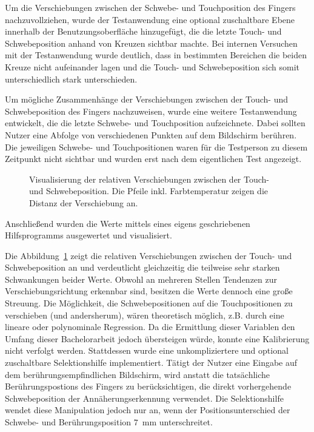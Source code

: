 \documentclass[12pt,numbers=noenddot,parskip,bibliography=totocnumbered,listof=totocnumbered]{scrreprt}
\begin{document}
Um die Verschiebungen zwischen der Schwebe- und Touchposition des Fingers nachzuvollziehen, wurde der Testanwendung eine optional zuschaltbare Ebene innerhalb der Benutzungsoberfläche hinzugefügt, die die letzte Touch- und Schwebeposition anhand von Kreuzen sichtbar machte. Bei internen Versuchen mit der Testanwendung wurde deutlich, dass in bestimmten Bereichen die beiden Kreuze nicht aufeinander lagen und die Touch- und Schwebeposition sich somit unterschiedlich stark unterschieden.

Um mögliche Zusammenhänge der Verschiebungen zwischen der Touch- und Schwebeposition des Fingers nachzuweisen, wurde eine weitere Testanwendung entwickelt, die die letzte Schwebe- und Touchposition aufzeichnete. Dabei sollten Nutzer eine Abfolge von verschiedenen Punkten auf dem Bildschirm berühren. Die jeweiligen Schwebe- und Touchpositionen waren für die Testperson zu diesem Zeitpunkt nicht sichtbar und wurden erst nach dem eigentlichen Test angezeigt.
\begin{figure}
\centering
{}
\hfill
{}
\caption{Visualisierung der relativen Verschiebungen zwischen der Touch- und Schwebeposition. Die Pfeile inkl. Farbtemperatur zeigen die Distanz der Verschiebung an.}
\label{klickschwebepositionen}
\end{figure}
Anschließend wurden die Werte mittels eines eigens geschriebenen Hilfsprogramms ausgewertet und visualisiert.

Die Abbildung~\ref{klickschwebepositionen} zeigt die relativen Verschiebungen zwischen der Touch- und Schwebeposition an und verdeutlicht gleichzeitig die teilweise sehr starken Schwankungen beider Werte. Obwohl an mehreren Stellen Tendenzen zur Verschiebungsrichtung erkennbar sind, besitzen die Werte dennoch eine große Streuung. Die Möglichkeit, die Schwebepositionen auf die Touchpositionen zu verschieben (und andersherum), wären theoretisch möglich, z.B. durch eine lineare oder polynominale Regression. Da die Ermittlung dieser Variablen den Umfang dieser Bachelorarbeit jedoch übersteigen würde, konnte eine Kalibrierung nicht verfolgt werden. Stattdessen wurde eine unkompliziertere und optional zuschaltbare Selektionshilfe implementiert. Tätigt der Nutzer eine Eingabe auf dem berührungsempfindlichen Bildschirm, wird anstatt die tatsächliche Berührungspostions des Fingers zu berücksichtigen, die direkt vorhergehende Schwebeposition der Annäherungserkennung verwendet. Die Selektionshilfe wendet diese Manipulation jedoch nur an, wenn der Positionsunterschied der Schwebe- und Berührungsposition \mbox{$7$ mm} unterschreitet.
\end{document}
